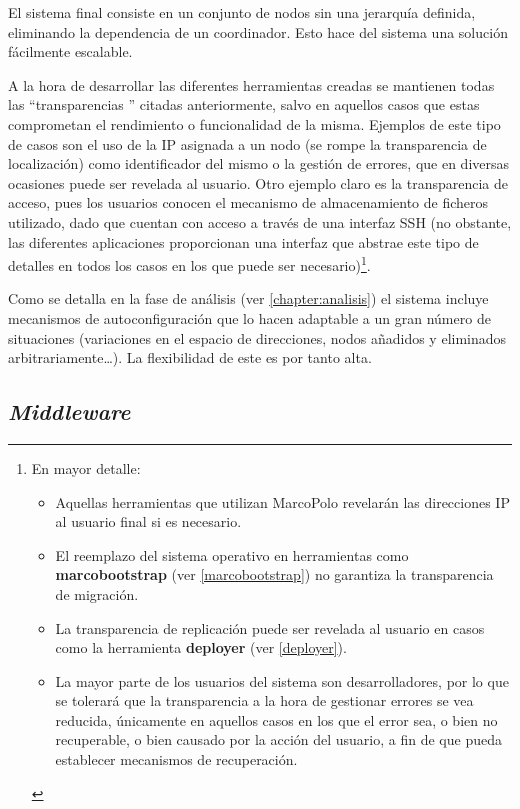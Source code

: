 El sistema final consiste en un conjunto de nodos sin una jerarquía definida, eliminando la dependencia de un coordinador. Esto hace del sistema una solución fácilmente escalable.

A la hora de desarrollar las diferentes herramientas creadas se mantienen todas las  ``transparencias '' citadas anteriormente, salvo en aquellos casos que estas comprometan el rendimiento o funcionalidad de la misma. Ejemplos de este tipo de casos son el uso de la IP asignada a un nodo (se rompe la transparencia de localización) como identificador del mismo o la gestión de errores, que en diversas ocasiones puede ser revelada al usuario. Otro ejemplo claro es la transparencia de acceso, pues los usuarios conocen el mecanismo de almacenamiento de ficheros utilizado, dado que cuentan con acceso a través de una interfaz SSH (no obstante, las diferentes aplicaciones proporcionan una interfaz que abstrae este tipo de detalles en todos los casos en los que puede ser necesario)\footnote{
  En mayor detalle:
  \begin{itemize}
  \item Aquellas herramientas que utilizan MarcoPolo revelarán las direcciones IP al usuario final si es necesario.
  \item El reemplazo del sistema operativo en herramientas como \textbf{marcobootstrap} (ver \ref{marcobootstrap}) no garantiza la transparencia de migración.
  \item La transparencia de replicación puede ser revelada al usuario en casos como la herramienta \textbf{deployer} (ver \ref{deployer}).
  \item La mayor parte de los usuarios del sistema son desarrolladores, por lo que se tolerará que la transparencia a la hora de gestionar errores se vea reducida, únicamente en aquellos casos en los que el error sea, o bien no recuperable, o bien causado por la acción del usuario, a fin de que pueda establecer mecanismos de recuperación.
  \end{itemize}
}.

Como se detalla en la fase de análisis (ver \ref{chapter:analisis}) el sistema incluye mecanismos de autoconfiguración que lo hacen adaptable a un gran número de situaciones (variaciones en el espacio de direcciones, nodos añadidos y eliminados arbitrariamente\dots). La flexibilidad de este es por tanto alta.

\subsection{\textit{Middleware}}
\label{teoria:middleware}

